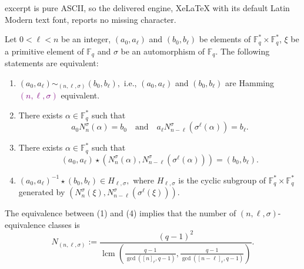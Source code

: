 \documentclass[10pt,a4paper]{amsart}
\DeclareMathOperator{\lcm}{lcm}
\newcommand{\Fq}{\mathbb{F}_{q}}
\begin{document}
excerpt is pure ASCII, so the delivered engine, XeLaTeX with its default Latin Modern text font, reports no missing character.
\begin{theorem}\label{Th.1}
 Let $0<\ell<n$ be an integer,  $(a_0, a_{\ell})$ and $(b_0, b_{\ell})$ be elements of $\mathbb{F}_q^{*} \times \mathbb{F}_q^{*}$,   $\xi$ be  a primitive element of $\Fq$   and  $ \sigma$ be an automorphism of $\Fq$. The following statements are equivalent:

\begin{enumerate}
    \item $(a_0, a_{\ell}) \sim_{(n,\ell,\sigma)} (b_0, b_{\ell}),$ i.e.,  $(a_0, a_{\ell}) $ and  $ (b_0, b_{\ell})$ are Hamming \textcolor{purple}{$(n,\ell,\sigma)$} equivalent.  

\item   There exists $\alpha\in \Fq^*$ such that $$ a_0 N_n^{\sigma}(\alpha)  = b_0   \quad  \text{and} \quad   a_{\ell} N^{\sigma}_{n-\ell}(\sigma^{\ell}(\alpha))=  b_{\ell}. $$
\item  There exists $\alpha\in \Fq^*$ such that $$ (a_0, a_{\ell}) \star
\left( N_n^{\sigma}(\alpha), N_{n-\ell}^{\sigma}(\sigma^{\ell} (\alpha)) \right)= (b_0,b_{\ell}) .$$
    
 \item   $ (a_0,a_{\ell})^{-1}\star (b_0,b_{\ell})\in H_{\ell,\sigma},$ where   $H_{\ell,\sigma}$ is the cyclic subgroup of $\Fq^*\times \Fq^*$ generated by $\left(N^{\sigma}_{n}(\xi), N_{n-\ell}^{\sigma}(\sigma^{\ell} (\xi))   \right).$
\end{enumerate}
The equivalence between (1) and (4) implies that the number of $(n,\ell,\sigma)$-equivalence classes is $$N_{(n,\ell,\sigma)}:= \dfrac{ (q-1)^2}{ \lcm\left(
\frac{q-1}{\gcd([n]_r,q-1)}, \frac{q-1}{ \gcd([n-\ell]_r,q-1)}\right)} .$$
\end{theorem}
\end{document}
